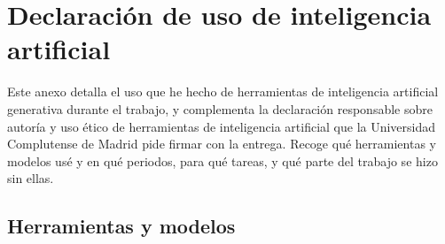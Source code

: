\chapter{Declaración de uso de inteligencia artificial}
\label{apendice:declaracionIA}

Este anexo detalla el uso que he hecho de herramientas de inteligencia artificial generativa durante el trabajo, y complementa la declaración responsable sobre autoría y uso ético de herramientas de inteligencia artificial que la Universidad Complutense de Madrid pide firmar con la entrega. Recoge qué herramientas y modelos usé y en qué periodos, para qué tareas, y qué parte del trabajo se hizo sin ellas.

\section{Herramientas y modelos}
\label{sec:declaracionHerramientas}

